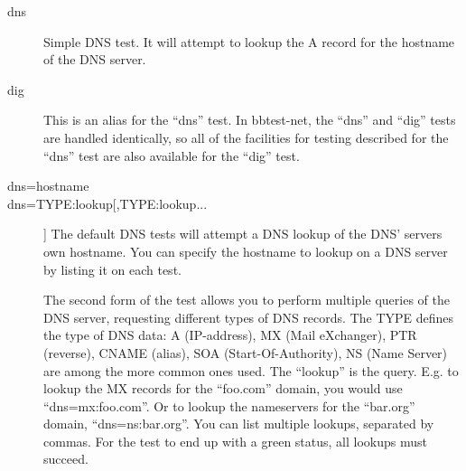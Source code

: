  \begin{description}
\item[dns] Simple DNS test. It will attempt to lookup the A record for the hostname of the DNS server. 

 

\item[dig] This is an alias for the ``dns'' test. In bbtest-net, the
  ``dns'' and ``dig'' tests are handled identically, so all of the
  facilities for testing described for the ``dns'' test are also
  available for the ``dig'' test. 


 

\item[dns=hostname]
\item[dns=TYPE:lookup[,TYPE:lookup...]] The default DNS tests will
  attempt a DNS lookup of the DNS' servers own hostname. You can
  specify the hostname to lookup on a DNS server by listing it on each
  test. 


  The second form of the test allows you to perform multiple queries
  of the DNS server, requesting different types of DNS records. The
  TYPE defines the type of DNS data: A (IP-address), MX (Mail
  eXchanger), PTR (reverse), CNAME (alias), SOA (Start-Of-Authority),
  NS (Name Server) are among the more common ones used. The ``lookup''
  is the query. E.g. to lookup the MX records for the ``foo.com''
  domain, you would use ``dns=mx:foo.com''. Or to lookup the
  nameservers for the ``bar.org'' domain, ``dns=ns:bar.org''. You can
  list multiple lookups, separated by commas. For the test to end up
  with a green status, all lookups must succeed. 



 



\end{description}

